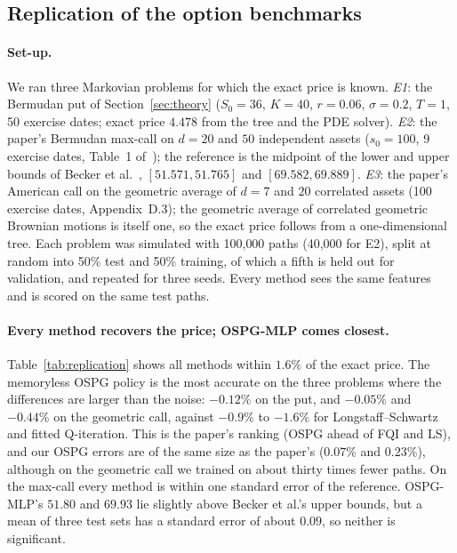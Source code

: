 \subsection{Replication of the option benchmarks}
\label{sec:replication}

\paragraph{Set-up.}
We ran three Markovian problems for which the exact price is known.
\emph{E1}: the Bermudan put of Section~\ref{sec:theory} ($S_0=36$, $K=40$, $r=0.06$, $\sigma=0.2$, $T=1$,
50 exercise dates; exact price $4.478$ from the tree and the PDE solver).
\emph{E2}: the paper's Bermudan max-call on $d=20$ and $50$ independent assets
($s_0=100$, 9 exercise dates, Table~1 of~\cite{ospg2023}); the reference is the midpoint of
the lower and upper bounds of Becker et al.~\cite{becker2019}, $[51.571, 51.765]$ and
$[69.582, 69.889]$.
\emph{E3}: the paper's American call on the geometric average of $d=7$ and $20$ correlated
assets (100 exercise dates, Appendix~D.3); the geometric average of correlated geometric
Brownian motions is itself one, so the exact price follows from a one-dimensional tree.
Each problem was simulated with 100{,}000 paths (40{,}000 for E2), split at random into
50\% test and 50\% training, of which a fifth is held out for validation, and repeated for
three seeds. Every method sees the same features and is scored on the same test paths.

\begin{table}[ht]
\centering\small
\caption{Out-of-sample values, mean over three seeds (standard deviation across seeds).
The standard error of one test set is about $0.013$ (put), $0.16$ (max-call) and $0.065$
(geometric call). DOS was not run on the 100-date geometric call.}
\label{tab:replication}

\end{table}

\paragraph{Every method recovers the price; OSPG-MLP comes closest.}
Table~\ref{tab:replication} shows all methods within $1.6\%$ of the exact price. The
memoryless OSPG policy is the most accurate on the three problems where the differences
are larger than the noise: $-0.12\%$ on the put, and $-0.05\%$ and $-0.44\%$ on the
geometric call, against $-0.9\%$ to $-1.6\%$ for Longstaff--Schwartz and fitted
Q-iteration. This is the paper's ranking (OSPG ahead of FQI and LS), and our OSPG errors are
of the same size as the paper's ($0.07\%$ and $0.23\%$), although on the geometric call we
trained on about thirty times fewer paths. On the max-call every method is within one standard error of the
reference. OSPG-MLP's $51.80$ and $69.93$ lie slightly above Becker et al.'s upper bounds,
but a mean of three test sets has a standard error of about $0.09$, so neither is
significant.

